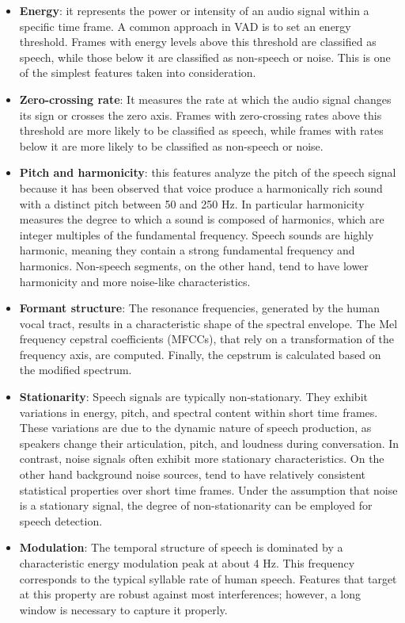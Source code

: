 \documentclass[../main.tex]{subfiles}
\begin{document}
\begin{itemize}
    \item \textbf{Energy}: it represents the power or intensity of an audio signal within a specific time frame. A common approach in VAD is to set an energy threshold. Frames with energy levels above this threshold are classified as speech, while those below it are classified as non-speech or noise. This is one of the simplest features taken into consideration. 

    \item \textbf{Zero-crossing rate}: It measures the rate at which the audio signal changes its sign or crosses the zero axis. Frames with zero-crossing rates above this threshold are more likely to be classified as speech, while frames with rates below it are more likely to be classified as non-speech or noise.  

    \item \textbf{Pitch and harmonicity}: this features analyze the pitch of the speech signal because it has been observed that voice produce a harmonically rich sound with a distinct pitch between 50 and 250 Hz. In particular harmonicity measures the degree to which a sound is composed of harmonics, which are integer multiples of the fundamental frequency. Speech sounds are highly harmonic, meaning they contain a strong fundamental frequency and harmonics. Non-speech segments, on the other hand, tend to have lower harmonicity and more noise-like characteristics.

    \item \textbf{Formant structure}: The resonance frequencies, generated by the human vocal tract, results in a characteristic shape of the spectral envelope. The Mel frequency cepstral coefficients (MFCCs), that rely on a transformation of the frequency axis, are computed. Finally, the cepstrum is calculated based on the modified spectrum.

    \item \textbf{Stationarity}: Speech signals are typically non-stationary. They exhibit variations in energy, pitch, and spectral content within short time frames. These variations are due to the dynamic nature of speech production, as speakers change their articulation, pitch, and loudness during conversation. In contrast, noise signals often exhibit more stationary characteristics. On the other hand background noise sources, tend to have relatively consistent statistical properties over short time frames. Under the assumption that noise is a stationary signal, the degree of non-stationarity can be employed for speech detection.

    \item \textbf{Modulation}: The temporal structure of speech is dominated by a characteristic
    energy modulation peak at about 4 Hz. This frequency corresponds to the typical syllable rate of human speech. Features that target at this property are robust against most interferences; however, a long window is necessary to capture it properly.

\end{itemize}
\end{document}
